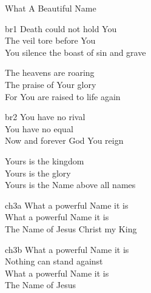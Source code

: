 \begin{song}{What A Beautiful Name}
    \begin{songframe}{br1}
        Death could not hold You \\
        The veil tore before You \\
        You silence the boast of sin and grave

        The heavens are roaring \\
        The praise of Your glory \\
        For You are raised to life again
    \end{songframe}

    \begin{songframe}{br2}
        You have no rival \\
        You have no equal \\
        Now and forever God You reign

        Yours is the kingdom \\
        Yours is the glory \\
        Yours is the Name above all names
    \end{songframe}

    \begin{songframe}{ch3a}
        What a powerful Name it is \\
        What a powerful Name it is \\
        The Name of Jesus Christ my King
    \end{songframe}

    \begin{songframe}{ch3b}
        What a powerful Name it is \\
        Nothing can stand against \\
        What a powerful Name it is \\
        The Name of Jesus
    \end{songframe}
    

\end{song}
\endinput
